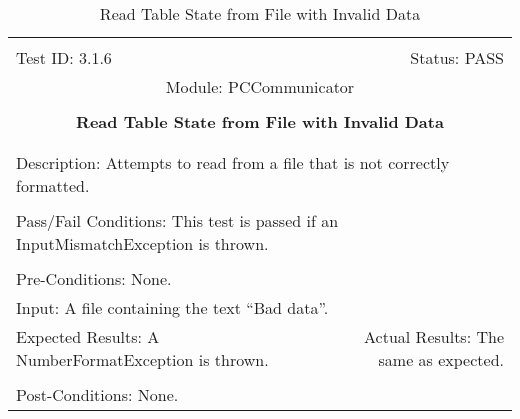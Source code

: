 \documentclass[titlepage]{article}
\begin{document}
\begin{center}
\begin{table}[h!]
\begin{tabular}{|l r|}\hline&\\[-2mm]
	Test ID: 3.1.6	&Status: PASS\\[-3mm]
	\multicolumn{2}{|c|}{Module: PCCommunicator}\\&\\
	\multicolumn{2}{|c|}{\textbf{\large{Read Table State from File with Invalid Data}}}\\&\\\hline&\\[-3mm]
	\multicolumn{2}{|p{\textwidth}|}{Description: Attempts to read from a file that is not correctly formatted.}\\[1mm]\hline&\\[-3mm]
	\multicolumn{2}{|p{\textwidth}|}{Pass/Fail Conditions: This test is passed if an InputMismatchException is thrown.}\\[1mm]\hline&\\[-3mm]
	\multicolumn{2}{|p{\textwidth}|}{Pre-Conditions: None.}\\[4mm]
	\multicolumn{2}{|p{\textwidth}|}{Input: A file containing the text ``Bad data''.}\\[2mm]\hline
	\multicolumn{1}{|p{0.49\textwidth}}{Expected Results: A NumberFormatException is thrown.}	&\multicolumn{1}{|p{0.45\textwidth}|}{Actual Results: The same as expected.}\\\hline&\\[-3mm]
	\multicolumn{2}{|p{\textwidth}|}{Post-Conditions: None.}\\\hline
\end{tabular}
\caption{Read Table State from File with Invalid Data}
\end{table}
\end{center}
\end{document}
